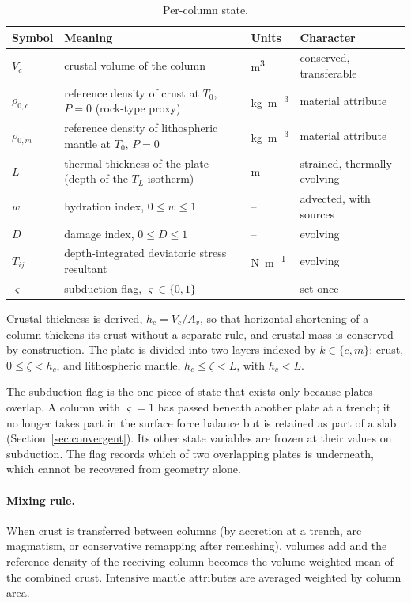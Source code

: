 \documentclass[11pt]{article}
\begin{document}
\begin{table}[h]
\centering
\caption{Per-column state.}
\label{tab:state}
\begin{tabular}{@{}lp{7.2cm}lp{3.0cm}@{}}
\toprule
Symbol & Meaning & Units & Character \\
\midrule
$V_c$ & crustal volume of the column & \si{\cubic\metre} & conserved, transferable \\
$\rho_{0,c}$ & reference density of crust at $T_0$, $P=0$ (rock-type proxy) & \si{\kilo\gram\per\cubic\metre} & material attribute \\
$\rho_{0,m}$ & reference density of lithospheric mantle at $T_0$, $P=0$ & \si{\kilo\gram\per\cubic\metre} & material attribute \\
$L$ & thermal thickness of the plate (depth of the $T_L$ isotherm) & \si{\metre} & strained, thermally evolving \\
$w$ & hydration index, $0 \le w \le 1$ & -- & advected, with sources \\
$D$ & damage index, $0 \le D \le 1$ & -- & evolving \\
$T_{ij}$ & depth-integrated deviatoric stress resultant & \si{\newton\per\metre} & evolving \\
$\varsigma$ & subduction flag, $\varsigma\in\{0,1\}$ & -- & set once \\
\bottomrule
\end{tabular}
\end{table}

Crustal thickness is derived, $h_c = V_c / A_v$, so that horizontal shortening
of a column thickens its crust without a separate rule, and crustal mass is
conserved by construction. The plate is divided into two layers indexed by
$k\in\{c,m\}$: crust, $0 \le \zeta < h_c$, and lithospheric mantle,
$h_c \le \zeta < L$, with $h_c < L$.

The subduction flag is the one piece of state that exists only because plates
overlap. A column with $\varsigma = 1$ has passed beneath another plate at a
trench; it no longer takes part in the surface force balance but is retained as
part of a slab (Section~\ref{sec:convergent}). Its other state variables are
frozen at their values on subduction. The flag records which of two overlapping
plates is underneath, which cannot be recovered from geometry alone.

\paragraph{Mixing rule.}
When crust is transferred between columns (by accretion at a trench, arc
magmatism, or conservative remapping after remeshing), volumes add and the
reference density of the receiving column becomes the volume-weighted mean of
the combined crust. Intensive mantle attributes are averaged weighted by column
area.
\end{document}
